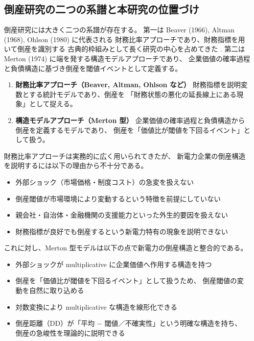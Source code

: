 \subsection{倒産研究の二つの系譜と本研究の位置づけ}

倒産研究には大きく二つの系譜が存在する。
第一は Beaver (1966), Altman (1968), Ohlson (1980) に代表される
財務比率アプローチであり、財務指標を用いて倒産を識別する
古典的枠組みとして長く研究の中心を占めてきた
\parencite{PozzoliPaolone2017}.%
第二は Merton (1974) に端を発する構造モデルアプローチであり、
企業価値の確率過程と負債構造に基づき倒産を閾値イベントとして定義する。


\begin{enumerate}
    \item \textbf{財務比率アプローチ（Beaver, Altman, Ohlson など）}  
          財務指標を説明変数とする統計モデルであり、倒産を
          「財務状態の悪化の延長線上にある現象」として捉える。

    \item \textbf{構造モデルアプローチ（Merton 型）}  
          企業価値の確率過程と負債構造から倒産を定義するモデルであり、
          倒産を「価値比が閾値を下回るイベント」として扱う。
\end{enumerate}

財務比率アプローチは実務的に広く用いられてきたが、
新電力企業の倒産構造を説明するには以下の理由から不十分である。

\begin{itemize}
    \item 外部ショック（市場価格・制度コスト）の急変を扱えない  
    \item 倒産閾値が市場環境により変動するという特徴を前提にしていない  
    \item 親会社・自治体・金融機関の支援能力といった外生的要因を扱えない  
    \item 財務指標が良好でも倒産するという新電力特有の現象を説明できない  
\end{itemize}

これに対し、Merton 型モデルは以下の点で新電力の倒産構造と整合的である。

\begin{itemize}
    \item 外部ショックが multiplicative に企業価値へ作用する構造を持つ  
    \item 倒産を「価値比が閾値を下回るイベント」として扱うため、
          倒産閾値の変動を自然に取り込める  
    \item 対数変換により multiplicative な構造を線形化できる  
    \item 倒産距離（DD）が「平均 − 閾値／不確実性」という明確な構造を持ち、
          倒産の急峻性を理論的に説明できる  
\end{itemize}

